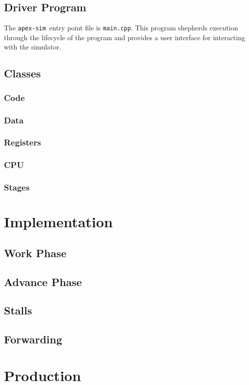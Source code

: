 \documentclass[12pt]{article}
\newcommand{\codename}[0]{\texttt{apex-sim}~}
\begin{document}
\subsection{Driver Program}
\label{sec:driver}
The \codename entry point file is \texttt{main.cpp}. This program shepherds execution through the lifecycle of the program and provides a user interface for interacting with the simulator.

\subsection{Classes}
\label{sec:classes}

\subsubsection{Code}

\subsubsection{Data}

\subsubsection{Registers}

\subsubsection{CPU}

\subsubsection{Stages}

\section{Implementation}
\label{sec:implementation}

\subsection{Work Phase}

\subsection{Advance Phase}

\subsection{Stalls}

\subsection{Forwarding}


\section{Production}
\label{sec:production}
\end{document}
